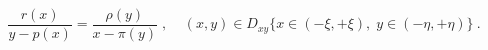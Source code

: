 \begin{equation}
\frac{r(x)}{y - p(x)} = \frac{\rho (y)}{x - \pi (y)}\; ,
\ \ \ \ \
(x,y) \in D_{xy}
\{x \in (-\xi, +\xi) ,\; y \in (-\eta , +\eta)\} \ .
\label{2.8}
\end{equation}

